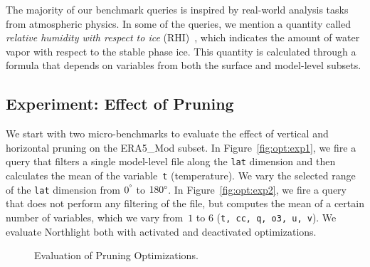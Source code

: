 \documentclass[conference]{IEEEtran}
\newcommand{\system}{Northlight}
\newcommand{\smalltt}[1]{{\texttt{\small #1}}}
\begin{document}
The majority of our benchmark queries is inspired by real-world analysis tasks from atmospheric physics.
In some of the queries, we mention a quantity called \textit{relative humidity with respect to ice} (RHI)~\cite{lit:rhi}, which indicates the amount of water vapor with respect to the stable phase ice.
This quantity is calculated through a formula\cite{lit:rhi-formula} that depends on variables from both the surface and model-level subsets.


\subsection{Experiment: Effect of Pruning}

We start with two micro-benchmarks to evaluate the effect of vertical and horizontal pruning on the ERA5\_Mod subset.
In Figure~\ref{fig:opt:exp1}, we fire a query that filters a single model-level file along the \smalltt{lat} dimension and then calculates the mean of the variable~\smalltt{t} (temperature). We vary the selected range of the \smalltt{lat} dimension from $0^\degree$ to $180\degree$.
In Figure~\ref{fig:opt:exp2}, we fire a query that does not perform any filtering of the file, but computes the mean of a certain number of variables, which we vary from~$1$ to $6$ (\smalltt{t, cc, q, o3, u, v}). We evaluate \system{} both with activated and deactivated optimizations.

\begin{figure}[h!]
\vspace*{-0.7cm}
\vspace*{-0.1cm}
\caption{Evaluation of Pruning Optimizations.}
\vspace*{-0.3cm}
\label{fig:opt}
\end{figure}
\end{document}
